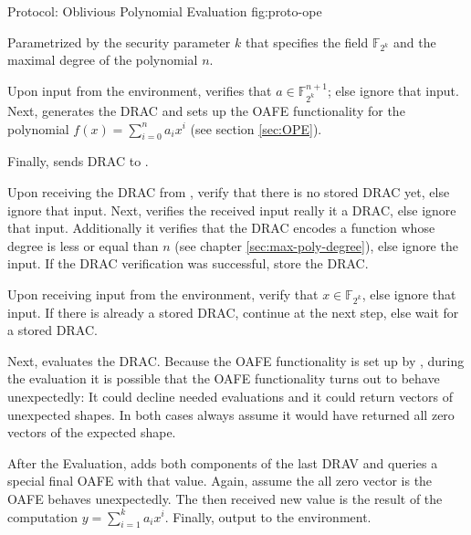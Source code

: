 \begin{JWprotocol}%
  {\JWprotoSymOPE}%
  {Protocol: Oblivious Polynomial Evaluation}%
  {fig:proto-ope}


  Parametrized by the security parameter $k$ that specifies the field
  $\mathbb{F}_{2^k}$ and the maximal degree of the polynomial $n$.


  \begin{JWprotoSteps}

  \item Upon input  from the environment, \JWpOne{}
    verifies that $a \in \mathbb{F}_{2^k}^{n+1}$; else ignore that input. Next,
    \JWpOne{} generates the DRAC and sets up the OAFE functionality for the
    polynomial $f(x) = \sum_{i=0}^n a_ix^i$ (see section \ref{sec:OPE}).

  \item Finally, \JWpOne{} sends DRAC to \JWpTwo{}.

  \end{JWprotoSteps}



  \begin{JWprotoSteps}

  \item Upon receiving the DRAC from \JWpOne{}, verify that there is no stored
    DRAC yet, else ignore that input. Next, \JWpTwo{} verifies the received
    input really it a DRAC, else ignore that input. Additionally it verifies
    that the DRAC encodes a function whose degree is less or equal than $n$ (see
    chapter \ref{sec:max-poly-degree}), else ignore the input. If the DRAC
    verification was successful, store the DRAC.

  \item Upon receiving input  from the environment,
    verify that $x \in \mathbb{F}_{2^k}$, else ignore that input. If there is
    already a stored DRAC, continue at the next step, else wait for a stored
    DRAC.

  \item Next, \JWpTwo{} evaluates the DRAC. Because the OAFE functionality is
    set up by \JWpOne{}, during the evaluation it is possible that the OAFE
    functionality turns out to behave unexpectedly: It could decline needed
    evaluations and it could return vectors of unexpected shapes. In both cases
    always assume it would have returned all zero vectors of the expected shape.

  \item After the Evaluation, \JWpTwo{} adds both components of the last DRAV
    and queries a special final OAFE with that value. Again, assume the all zero
    vector is the OAFE behaves unexpectedly. The then received new value is the
    result of the computation $y = \sum_{i=1}^k a_ix^i$. Finally, output
     to the environment.

  \end{JWprotoSteps}

\end{JWprotocol}

